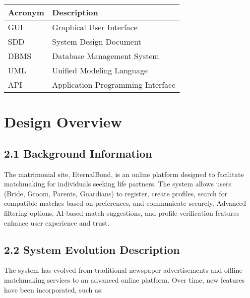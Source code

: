 \begin{longtable}[]{@{}
  >{\raggedright\arraybackslash}p{}
  >{\raggedright\arraybackslash}p{}@{}}
\toprule\noalign{}
\begin{minipage}[b]{\linewidth}\raggedright
Acronym
\end{minipage} & \begin{minipage}[b]{\linewidth}\raggedright
Description
\end{minipage} \\
\midrule\noalign{}
\endhead
\bottomrule\noalign{}
\endlastfoot
GUI & Graphical User Interface \\
SDD & System Design Document \\
DBMS & Database Management System \\
UML & Unified Modeling Language \\
API & Application Programming Interface \\
\end{longtable}

\section{\texorpdfstring{ Design
Overview}{ Design Overview}}\label{design-overview}

\subsection{2.1 Background Information}\label{background-information}

The matrimonial site, EternalBond, is an online platform designed to
facilitate matchmaking for individuals seeking life partners. The system
allows users (Bride, Groom, Parents, Guardians) to register, create
profiles, search for compatible matches based on preferences, and
communicate securely. Advanced filtering options, AI-based match
suggestions, and profile verification features enhance user experience
and trust.

\subsection{2.2 System Evolution
Description}\label{system-evolution-description}

The system has evolved from traditional newspaper advertisements and
offline matchmaking services to an advanced online platform. Over time,
new features have been incorporated, such as:

